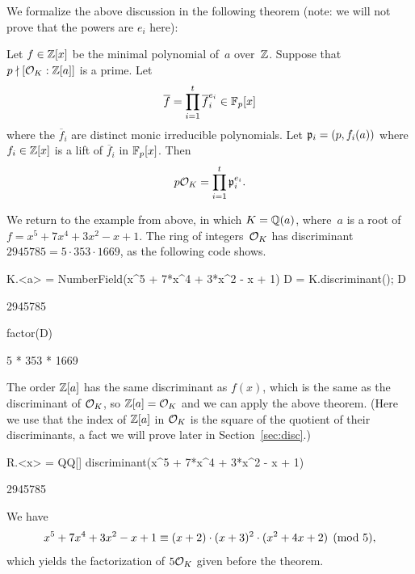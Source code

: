 We formalize the above discussion in the following theorem (note: we will
not prove that the powers are $e_i$ here):
\begin{theorem}\label{thm:fac1}
Let $f\in\mathbb{Z}[x]$ be the minimal polynomial of~$a$ over~$\mathbb{Z}$.
Suppose that~$p\nmid [\mathcal{O}_K:\mathbb{Z}[a]]$ is a prime.
Let
$$
 \overline{f} = \prod_{i=1}^t \overline{f}_i^{e_i} \in \mathbb{F}_p[x]
$$
where the $\overline{f}_i$ are distinct monic irreducible
polynomials.
Let
$
  \mathfrak{p}_i = (p,f_i(a))
$
where $f_i\in\mathbb{Z}[x]$ is a lift of $\overline{f}_i$ in $\mathbb{F}_p[x]$.
Then
$$
  p\mathcal{O}_K = \prod_{i=1}^t \mathfrak{p}_i^{e_i}.
$$
\end{theorem}

We return to the example from above, in which $K=\mathbb{Q}(a)$, where~$a$ is
a root of $f = x^5+7x^4+3x^2-x+1$.  The ring
of integers~$\mathcal{O}_K$ has discriminant $2945785 = 5\cdot 353\cdot 1669$,
as the following \sage code shows.
\begin{sagecode}
\begin{sagecell}
K.<a> = NumberField(x^5 + 7*x^4 + 3*x^2 - x + 1)
D = K.discriminant(); D
\end{sagecell}
\begin{sageout}
2945785
\end{sageout}
\begin{sagecell}
factor(D)
\end{sagecell}
\begin{sageout}
5 * 353 * 1669
\end{sageout}
\end{sagecode}
The order $\mathbb{Z}[a]$ has the same discriminant as $f(x)$, which
is the same as the discriminant of $\mathcal{O}_K$, so
$\mathbb{Z}[a]=\mathcal{O}_K$ and we can apply the above theorem.
(Here we use that the index of $\mathbb{Z}[a]$ in $\mathcal{O}_K$
is the square of the quotient of their discriminants,
a fact we will prove later in Section~\ref{sec:disc}.)
\begin{sagecode}
\begin{sagecell}
R.<x> = QQ[]
discriminant(x^5 + 7*x^4 + 3*x^2 - x + 1)
\end{sagecell}
\begin{sageout}
2945785
\end{sageout}
\end{sagecode}
We have
$$
  x^5+7x^4+3x^2-x+1 \equiv (x+2)\cdot (x+3)^2 \cdot (x^2+4x+2)\pmod{5},
$$
which yields the factorization of $5\mathcal{O}_K$ given before the theorem.

